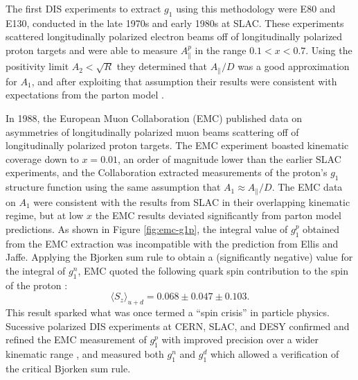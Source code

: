 The first DIS experiments to extract $g_1$ using this methodology were E80 and
E130, conducted in the late 1970s and early 1980s at SLAC. These experiments
scattered longitudinally polarized electron beams off of longitudinally
polarized proton targets and were able to measure $A_{\parallel}^p$ in the
range $0.1 < x < 0.7$. Using the positivity limit $A_2 < \sqrt{R}$ they
determined that $A_{\parallel}/D$ was a good approximation for $A_1$, and
after exploiting that assumption their results were consistent with
expectations from the parton model \cite{Alguard:1976bm, Baum:1983ha}.

In 1988, the European Muon Collaboration (EMC) published data on asymmetries
of longitudinally polarized muon beams scattering off of longitudinally
polarized proton targets. The EMC experiment boasted kinematic coverage down
to $x = 0.01$, an order of magnitude lower than the earlier SLAC experiments,
and the Collaboration extracted measurements of the proton's $g_1$ structure
function using the same assumption that $A_1 \approx A_{\parallel}/D$. The EMC
data on $A_1$ were consistent with the results from SLAC in their overlapping
kinematic regime, but at low $x$ the EMC results deviated significantly from
parton model predictions. As shown in Figure \ref{fig:emc-g1p}, the integral
value of $g_1^p$ obtained from the EMC extraction was incompatible with the
prediction from Ellis and Jaffe. Applying the Bjorken sum rule to obtain a
(significantly negative) value for the integral of $g_1^n$, EMC quoted the
following quark spin contribution to the spin of the proton
\cite{Ashman:1987hv}: %
%
\begin{equation}
  \langle S_z \rangle_{u+d} = 0.068 \pm 0.047 \pm 0.103.
\end{equation}
%
This result sparked what was once termed a ``spin crisis'' in particle
physics. Sucessive polarized DIS experiments at CERN, SLAC, and DESY confirmed
and refined the EMC measurement of $g_1^p$ with improved precision over a
wider kinematic range \cite{Adams:1994zd}, and measured both $g_1^n$
\cite{Anthony:1993uf} and $g_1^d$ \cite{Adeva:1993km} which allowed a
verification of the critical Bjorken sum rule.

